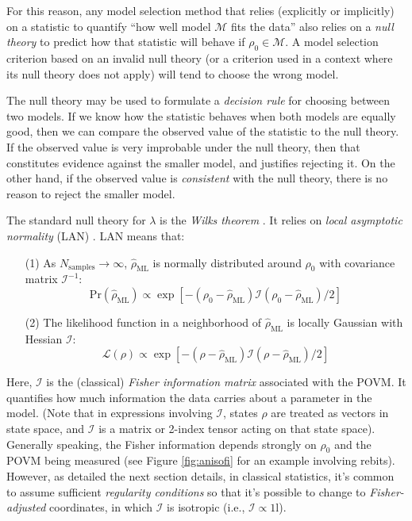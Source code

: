 \documentclass[aps,pra, twocolumn]{revtex4-1}
\newcommand{\M}{\mathcal{M}}
\newcommand{\Id}{\mathbb{I}}
\def\Id{1\!\mathrm{l}}
\newcommand{\Fi}{\mathcal{I}}
\newcommand{\rhohat}{\hat{\rho}}
\begin{document}
For this reason, any model selection method that relies (explicitly or implicitly) on a statistic to quantify ``how well model $\M$ fits the data'' also relies on a \emph{null theory} to predict how that statistic will behave if $\rho_{0} \in \M$.  A model selection criterion based on an invalid null theory (or a criterion used in a context where its null theory does not apply) will tend to choose the wrong model.

The null theory may be used to formulate a \emph{decision rule} for choosing between two models. If we know how the statistic behaves when both models are equally good, then we can compare the observed value of the statistic to the null theory. If the observed value is very improbable under the null theory, then that constitutes evidence against the smaller model, and justifies rejecting it. On the other hand, if the observed value is \emph{consistent} with the null theory, there is no reason to reject the smaller model.

The standard null theory for $\lambda$ is the \emph{Wilks theorem} \cite{Wilks1938}. It relies on \emph{local asymptotic normality} (LAN) \cite{LeCam1970, LeCam1956}. LAN means that:
\begin{itemize}[nosep]
\item[(1)] As $N_{\mathrm{samples}}\rightarrow \infty$,  $\rhohat_{\mathrm{ML}}$ is normally distributed around $\rho_{0}$ with covariance matrix $\Fi^{-1}$:
\begin{equation}
\label{eq:landist}
\mathrm{Pr}(\rhohat_{\mathrm{ML}}) \propto \exp\left[-(\rho_{0} - \rhohat_{\mathrm{ML}})\mathcal{I}(\rho_{0} - \rhohat_{\mathrm{ML}})/2\right]
\end{equation}
\item[(2)]The likelihood function in a neighborhood of $\rhohat_{\mathrm{ML}}$ is locally Gaussian with Hessian $\Fi$:
\begin{equation}
\label{eq:lanl}
\mathcal{L}(\rho) \propto \exp\left[-(\rho - \rhohat_{\mathrm{ML}})\mathcal{I}(\rho - \rhohat_{\mathrm{ML}})/2\right]
\end{equation}
\end{itemize}
Here, $\Fi$ is the (classical) \emph{Fisher information matrix} associated with the POVM. It quantifies how much information the data carries about a parameter in the model.  (Note that in expressions involving $\mathcal{I}$, states $\rho$ are treated as vectors in state space, and $\mathcal{I}$ is a matrix or 2-index tensor acting on that state space). Generally speaking, the Fisher information depends strongly on $\rho_{0}$ and the POVM being measured (see Figure \ref{fig:anisofi} for an example involving rebits). However, as detailed the next section details, in classical statistics, it's common to assume sufficient \emph{regularity conditions} so that it's possible to change to \emph{Fisher-adjusted} coordinates, in which $\mathcal{I}$ is isotropic (i.e., $\mathcal{I} \propto \Id$).
\end{document}
